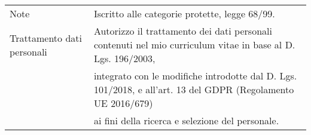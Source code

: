 \documentclass[]{style}
\begin{document}
\makecvfooter
{{\def\arraystretch{1.15}{\begin{tabular}{ l l }
		Note  & { Iscritto alle categorie protette, legge 68/99. } \\
		Trattamento dati personali  & { Autorizzo il trattamento dei dati personali contenuti nel mio curriculum vitae in base al D. Lgs. 196/2003, } \\
		& { integrato con le modifiche introdotte dal D. Lgs. 101/2018, e all’art. 13 del GDPR (Regolamento UE 2016/679) } \\
		& { ai fini della ricerca e selezione del personale. } \\
		\end{tabular}}}}
{}
{}

\
\end{document}

